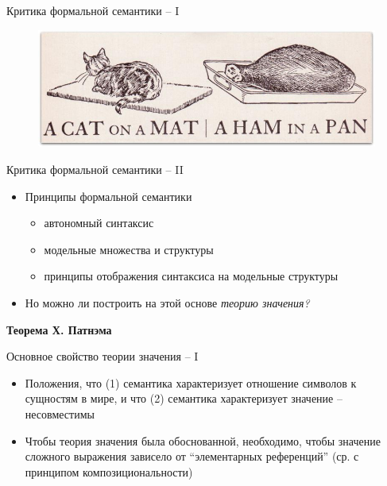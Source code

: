 \documentclass{beamer}
\begin{document}
\begin{frame}{Критика формальной семантики -- I}
\begin{center}
	\begin{figure}[H]
		\includegraphics[scale=0.39]{cat_mat.jpg} 
	\end{figure}
\end{center}
\end{frame}

\begin{frame}{Критика формальной семантики -- II}
\begin{itemize}
    \item Принципы формальной семантики
    \medskip
        \begin{itemize}
            \item автономный синтаксис
            \medskip
            \item модельные множества и структуры
            \medskip
            \item принципы отображения синтаксиса на модельные структуры
        \end{itemize}
    \medskip
    \item Но можно ли построить на этой основе \textit{теорию значения?}
\end{itemize}
\end{frame}

\begin{frame}{}
\begin{center}
	\textbf{Теорема Х. Патнэма}
\end{center}
\end{frame}

\begin{frame}{Основное свойство теории значения -- I}
\begin{itemize}
	\item Положения, что (1) семантика характеризует отношение символов к сущностям в мире, и что (2) семантика характеризует значение -- несовместимы
	\item Чтобы теория значения была обоснованной, необходимо, чтобы значение сложного выражения зависело от ``элементарных референций'' (ср. с принципом композициональности)
\end{itemize}
\end{frame}
\end{document}
